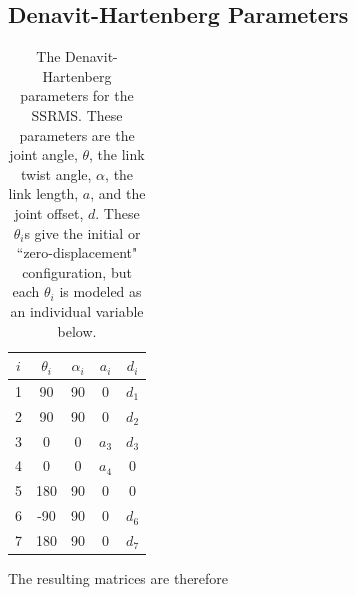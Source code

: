 \documentclass{article}
\begin{document}
\subsection{Denavit-Hartenberg Parameters}
\begin{table}[h]
\centering
\begin{tabular}{c|*{4}{c}}
\toprule
$i$ & $\theta_i$ & $\alpha_i$ & $a_i$ & $d_i$ \\
\midrule
1 &  90 & 90 &     0 & $d_1$ \\
2 &  90 & 90 &     0 & $d_2$ \\
3 &   0 &  0 & $a_3$ & $d_3$ \\
4 &   0 &  0 & $a_4$ &     0 \\
5 & 180 & 90 &     0 &     0 \\
6 & -90 & 90 &     0 & $d_6$ \\
7 & 180 & 90 &     0 & $d_7$ \\
\bottomrule
\end{tabular}
\caption{The Denavit-Hartenberg parameters for the SSRMS. These parameters are the joint angle, $\theta$, the link twist angle, $\alpha$, the link length, $a$, and the joint offset, $d$. These $\theta_i$s give the initial or ``zero-displacement" configuration, but each $\theta_i$ is modeled as an individual variable below.}
\label{dhparams}
\end{table}
The resulting matrices are therefore
\end{document}
